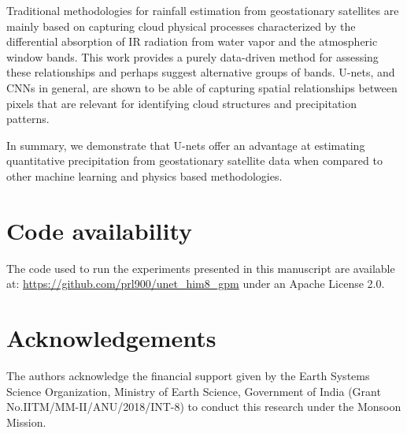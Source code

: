 \documentclass[3p,times]{elsarticle}
\begin{document}
Traditional methodologies for rainfall estimation from geostationary satellites are mainly based on capturing cloud physical processes characterized by the differential absorption of IR radiation from water vapor and the atmospheric window bands. This work provides a purely data-driven method for assessing these relationships and perhaps suggest alternative groups of bands. U-nets, and CNNs in general, are shown to be able of capturing spatial relationships between pixels that are relevant for identifying cloud structures and precipitation patterns.

In summary, we demonstrate that U-nets offer an advantage at estimating quantitative precipitation from geostationary satellite data when compared to other machine learning and physics based methodologies.


\section{Code availability}

The code used to run the experiments presented in this manuscript are available at: \href{https://github.com/prl900/unet_him8_gpm}{https://github.com/prl900/unet\_him8\_gpm} under an Apache License 2.0.

\section{Acknowledgements}

The authors acknowledge the financial support given by the Earth Systems Science Organization, Ministry of Earth Science, Government of India (Grant No.IITM/MM-II/ANU/2018/INT-8) to conduct this research under the Monsoon Mission.













\end{document}
